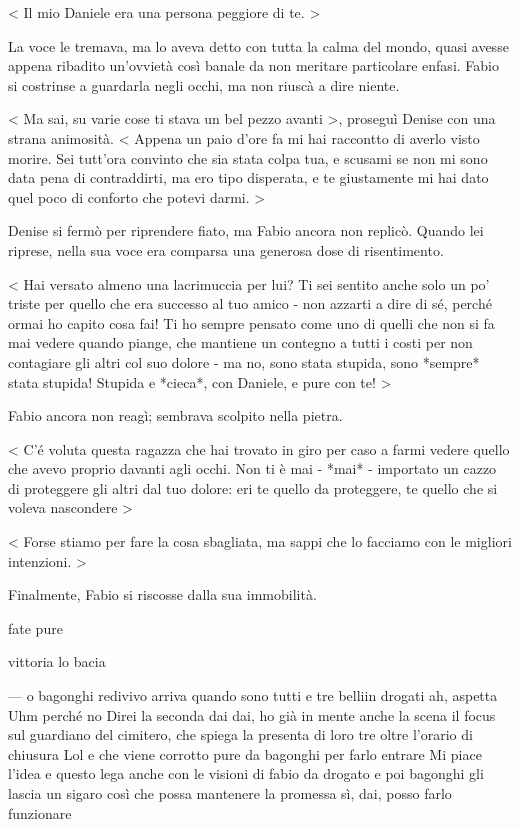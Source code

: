 < Il mio Daniele era una persona peggiore di te. >

La voce le tremava, ma lo aveva detto con tutta la calma del mondo, quasi avesse appena ribadito un'ovvietà così banale da non meritare particolare enfasi. Fabio si costrinse a guardarla negli occhi, ma non riuscà a dire niente.

< Ma sai, su varie cose ti stava un bel pezzo avanti >, proseguì Denise con una strana animosità. < Appena un paio d'ore fa mi hai raccontto di averlo visto morire. Sei tutt'ora convinto che sia stata colpa tua, e scusami se non mi sono data pena di contraddirti, ma ero tipo disperata, e te giustamente mi hai dato quel poco di conforto che potevi darmi. >

Denise si fermò per riprendere fiato, ma Fabio ancora non replicò. Quando lei riprese, nella sua voce era comparsa una generosa dose di risentimento.

< Hai versato almeno una lacrimuccia per lui? Ti sei sentito anche solo un po' triste per quello che era successo al tuo amico - non azzarti a dire di sé, perché ormai ho capito cosa fai! Ti ho sempre pensato come uno di quelli che non si fa mai vedere quando piange, che mantiene un contegno a tutti i costi per non contagiare gli altri col suo dolore - ma no, sono stata stupida, sono *sempre* stata stupida! Stupida e *cieca*, con Daniele, e pure con te! >

Fabio ancora non reagì; sembrava scolpito nella pietra.

< C'é voluta questa ragazza che hai trovato in giro per caso a farmi vedere quello che avevo proprio davanti agli occhi. Non ti è mai - *mai* - importato un cazzo di proteggere gli altri dal tuo dolore: eri te quello da proteggere, te quello che si voleva nascondere >

< Forse stiamo per fare la cosa sbagliata, ma sappi che lo facciamo con le migliori intenzioni. >

Finalmente, Fabio si riscosse dalla sua immobilità.

fate pure

vittoria lo bacia

---
o bagonghi redivivo arriva quando sono tutti e tre belliin drogati
ah, aspetta
Uhm
perché no
Direi la seconda
dai dai, ho già in mente anche la scena
il focus sul guardiano del cimitero, che spiega la presenta di loro tre oltre l'orario di chiusura
Lol
e che viene corrotto pure da bagonghi per farlo entrare
Mi piace l'idea
e questo lega anche con le visioni di fabio da drogato
e poi bagonghi gli lascia un sigaro
così che possa mantenere la promessa
sì, dai, posso farlo funzionare